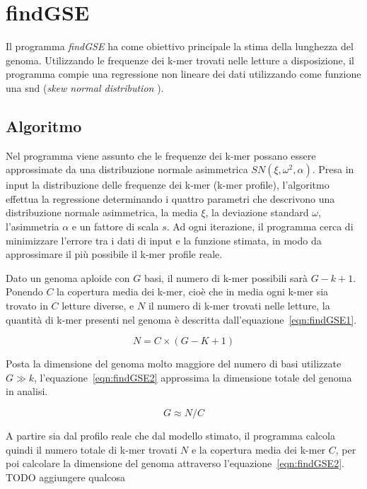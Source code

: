\documentclass[crop=false, class=book]{standalone}
\begin{document}
	\section{findGSE}
	
	Il programma \textit{findGSE} \cite{sun2017findGSE} ha come obiettivo principale la stima della lunghezza del genoma. Utilizzando le frequenze dei k-mer trovati nelle letture a disposizione, il programma compie una regressione non lineare dei dati utilizzando come funzione una \gls{snd} (\textit{skew normal distribution} \cite{azzalini1985class,azzalini2005skew}).
	
	
	\subsection{Algoritmo}
	Nel programma viene assunto che le frequenze dei k-mer possano essere approssimate da una distribuzione normale asimmetrica $SN(\xi, \omega^2, \alpha)$. Presa in input la distribuzione delle frequenze dei k-mer (k-mer profile), l'algoritmo effettua la regressione determinando i quattro parametri che descrivono una distribuzione normale asimmetrica, la media $\xi$, la deviazione standard $\omega$, l'asimmetria $\alpha$ e un fattore di scala $s$. Ad ogni iterazione, il programma cerca di minimizzare l'errore tra i dati di input e la funzione stimata, in modo da approssimare il più possibile il k-mer profile reale. 
	
	Dato un genoma aploide con $G$ basi, il numero di k-mer possibili sarà $G-k+1$. Ponendo $C$ la copertura media dei k-mer, cioè che in media ogni k-mer sia trovato in $C$ letture diverse, e $N$ il numero di k-mer trovati nelle letture, la quantità di k-mer presenti nel genoma è descritta dall'equazione~\vref{eqn:findGSE1}. 	
	
	\begin{equation}
		\label{eqn:findGSE1}
		N=C \times (G-K+1)
	\end{equation}
		
	
	Posta la dimensione del genoma molto maggiore del numero di basi utilizzate $G\gg k$, l'equazione~\vref{eqn:findGSE2} approssima la dimensione totale del genoma in analisi.
	
	\begin{equation}
		\label{eqn:findGSE2}
		G\approx N/C
	\end{equation}

	A partire sia dal profilo reale che dal modello stimato, il programma calcola quindi il numero totale di k-mer trovati $N$ e la copertura media dei k-mer $C$, per poi calcolare la dimensione del genoma attraverso l'equazione~\vref{eqn:findGSE2}.
	TODO aggiungere qualcosa

	

	
	
	
\end{document}
